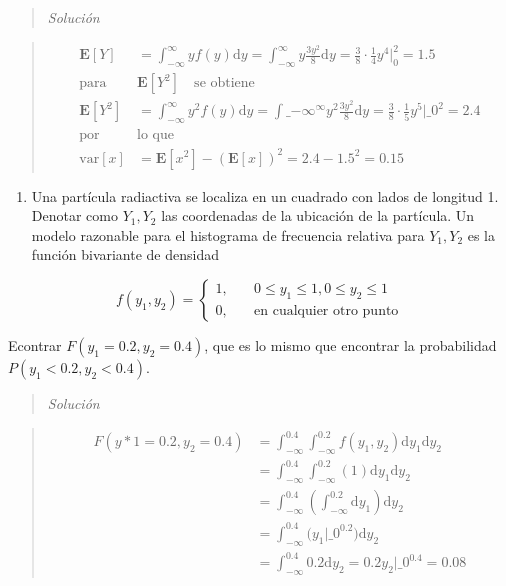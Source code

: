 \documentclass[
  letterpaper,
  DIV=11,
  numbers=noendperiod]{scrartcl}
\providecommand{\tightlist}{%
  \setlength{\itemsep}{0pt}\setlength{\parskip}{0pt}}\usepackage{longtable,booktabs,array}
\begin{document}
\begin{quote}
\emph{Solución}
\end{quote}

\begin{quote}
\begin{align*}
\mathbf{E}[Y] &= \int_{-\infty}^\infty yf(y)\text{d}y= \int_{-\infty}^\infty y\frac{3y^2}{8}\text{d}y = \frac{3}{8}\cdot\frac{1}{4}y^4 \Bigg|_0^2=1.5\\
\text{para } &\mathbf{E}[Y^2]\quad \text{se obtiene}\\
\mathbf{E}[Y^2] &= \int_{-\infty}^\infty y^2f(y)\text{d}y= \int\_{-\infty}^\infty y^2\frac{3y^2}{8}\text{d}y = \frac{3}{8}\cdot\frac{1}{5}y^5 \Bigg|\_0^2=2.4\\
\text{por }&\text{lo que}\\
\text{var}[x]&=\mathbf{E}[x^2]-(\mathbf{E}[x])^2 = 2.4 - 1.5^2 = 0.15
\end{align*}
\end{quote}

\begin{enumerate}
\def\labelenumi{\arabic{enumi}.}
\setcounter{enumi}{4}
\tightlist
\item
  Una partícula radiactiva se localiza en un cuadrado con lados de
  longitud 1. Denotar como \(Y_1, Y_2\) las coordenadas de la ubicación
  de la partícula. Un modelo razonable para el histograma de frecuencia
  relativa para \(Y_1, Y_2\) es la función bivariante de densidad
\end{enumerate}

\[
  f(y_1, y_2) = \begin{cases}
  1,\quad & 0 \leq y_1 \leq 1, 0 \leq y_2 \leq 1\\
  0, \quad & \text{en cualquier otro punto}
  \end{cases}
\]

Econtrar \(F(y_1=0.2, y_2=0.4)\), que es lo mismo que encontrar la
probabilidad \(P(y_1<0.2, y_2<0.4)\).

\begin{quote}
\emph{Solución}
\end{quote}

\begin{quote}
\begin{align}
F(y*1=0.2, y_2=0.4)%
&= \int_{-\infty}^{0.4} \int_{-\infty}^{0.2} f(y_1, y_2)\text{d}y_1\text{d}y_2 \\
&= \int_{-\infty}^{0.4} \int_{-\infty}^{0.2} (1)\text{d}y_1\text{d}y_2 \\
&= \int_{-\infty}^{0.4} \left(\int_{-\infty}^{0.2} \text{d}y_1\right)\text{d}y_2\\
&= \int_{-\infty}^{0.4} \Bigg( y_1\Big|\_0^{0.2} \Bigg)\text{d}y_2\\
&= \int_{-\infty}^{0.4} 0.2 \text{d}y_2 = 0.2y_2\Big|\_0^{0.4} = 0.08
\end{align}
\end{quote}
\end{document}
